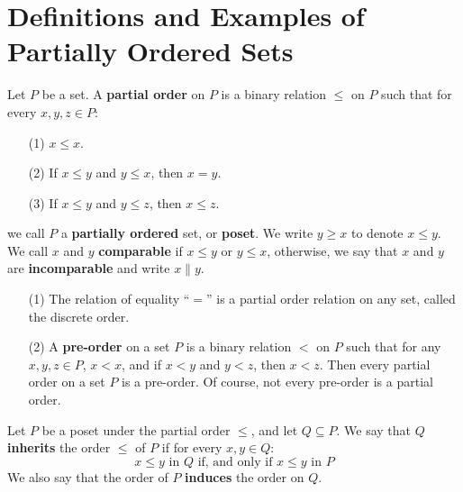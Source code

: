 \section{Definitions and Examples of Partially Ordered Sets}
\label{section_1.1}

\begin{definition}
  Let $P$ be a set. A \textbf{partial order} on $P$ is a binary
  relation $\leq$ on $P$ such that for every  $x,y, z \in P$:
  \begin{enumerate}
    \item[(1)] $x \leq x$.

    \item[(2)] If $x \leq y$ and $y \leq x$, then $x=y$.

    \item[(3)] If $x \leq y$ and $y \leq z$, then $x \leq z$.
  \end{enumerate}
  we call $P$ a \textbf{partially ordered} set, or \textbf{poset}. We
  write $y \geq x$ to denote $x \leq y$. We call  $x$ and $y$
  \textbf{comparable} if $x \leq y$ or $y \leq x$, otherwise, we say
  that $x$ and $y$ are \textbf{incomparable} and write $x \| y$.
\end{definition}

\begin{example}\label{example_1.1}
  \begin{enumerate}
    \item[(1)] The relation of equality ``$=$'' is a partial order
      relation on any set, called the discrete order.

    \item[(2)] A \textbf{pre-order} on a set $P$ is a binary relation
       $<$ on $P$ such that for any $x,y, z \in P$, $x < x$, and if
       $x < y$ and $y < z$, then $x < z$. Then every partial order on
       a set $P$ is a pre-order. Of course, not every pre-order is a
       partial order.
  \end{enumerate}
\end{example}

\begin{definition}
  Let $P$ be a poset under the partial order $\leq$, and let $Q
  \subseteq P$. We say that $Q$ \textbf{inherits} the order $\leq$ of
   $P$ if for every $x,y \in Q$:
   \begin{equation*}
     x \leq y \text{ in } Q \text{ if, and only if } x \leq y \text{ in } P
   \end{equation*}
   We also say that the order of $P$  \textbf{induces} the order on
   $Q$.
\end{definition}


